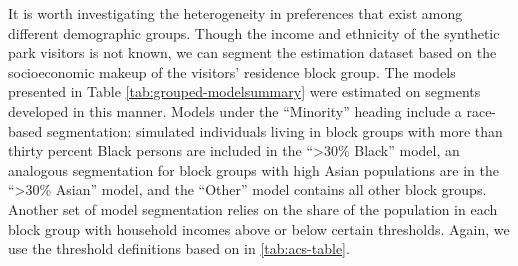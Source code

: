 \documentclass[]{elsarticle} %
\begin{document}
It is worth investigating the heterogeneity in preferences that exist among
different demographic groups. Though the income and ethnicity of the synthetic
park visitors is not known, we can segment the estimation dataset based on the
socioeconomic makeup of the visitors' residence block group. The models presented in
Table \ref{tab:grouped-modelsummary} were
estimated on segments developed in this manner.
Models under the ``Minority'' heading include a
race-based segmentation: simulated individuals living in block groups with more
than thirty percent Black persons are included in the ``\textgreater30\% Black'' model, an
analogous segmentation for block groups with high Asian populations are in the
``\textgreater30\% Asian'' model, and the ``Other'' model contains all other block groups.
Another set of model segmentation relies on the share of the population in each
block group with household incomes above or below certain thresholds. Again,
we use the threshold definitions based on in \ref{tab:acs-table}.
\end{document}
